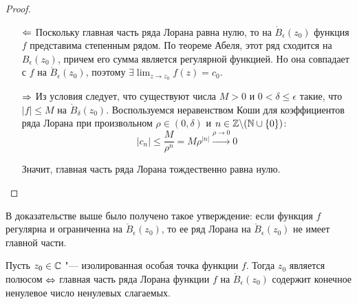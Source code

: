 \begin{proof}~
	\begin{itemize}
		\item[$\Leftarrow$]Поскольку главная часть ряда Лорана равна нулю, то на $\mathring B_\epsilon(z_0)$ функция $f$ представима степенным рядом. По теореме Абеля, этот ряд сходится на $B_\epsilon(z_0)$, причем его сумма является регулярной функцией. Но она совпадает с $f$ на $\mathring B_\epsilon(z_0)$, поэтому $\exists \lim_{z \to z_0}f(z) = c_0$.
		
		\item[$\Rightarrow$]Из условия следует, что существуют числа $M > 0$ и $0 < \delta \le \epsilon$ такие, что $|f| \le M$ на $\mathring B_\delta(z_0)$. Воспользуемся неравенством Коши для коэффициентов ряда Лорана при произвольном $\rho \in (0, \delta)$ и $n \in \mathbb{Z} \backslash (\mathbb{N} \cup \{0\})$:
		\[|c_n| \le \frac{M}{\rho^n} = M\rho^{|n|} \xrightarrow{\rho \to 0} 0\]
		
		Значит, главная часть ряда Лорана тождественно равна нулю.\qedhere
	\end{itemize}
\end{proof}

\begin{note}
	В доказательстве выше было получено такое утверждение: если функция $f$ регулярна и ограниченна на $\mathring B_\epsilon(z_0)$, то ее ряд Лорана на $\mathring B_\epsilon(z_0)$ не имеет главной части.
\end{note}

\begin{proposition}
	Пусть $z_0 \in \mathbb{C}$ "--- изолированная особая точка функции $f$. Тогда $z_0$ является полюсом $\Leftrightarrow$ главная часть ряда Лорана функции $f$ на $\mathring B_\epsilon(z_0)$ содержит конечное ненулевое число ненулевых слагаемых.
\end{proposition}

